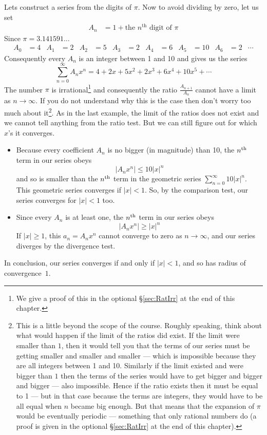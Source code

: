 \begin{eg}\label{eg:PWRd}
Lets construct a series from the digits of $\pi$. Now to avoid dividing by zero, let us set
\begin{align*}
  A_n &= 1 + \text{the $n^\mathrm{th}$ digit of $\pi$}
\end{align*}
Since $\pi = 3.141591\dots$
\begin{align*}
  A_0 &= 4 &
  A_1 &= 2 &
  A_2 &= 5 &
  A_3 &= 2 &
  A_4 &= 6 &
  A_5 &= 10 &
  A_6 &= 2 &
  \cdots
\end{align*}
Consequently every $A_n$ is an integer between 1 and 10 and gives us
the series
\begin{equation*}
\sum_{n=0}^\infty A_n x^n = 4 + 2x + 5x^2 + 2x^3 + 6x^4 +10 x^5 + \cdots
\end{equation*}
The number $\pi$ is irrational\footnote{We give a proof of this in the
optional \S\ref{sec:RatIrr} at the end of this chapter.} and
consequently the ratio $\frac{A_{n+1}}{A_n}$ cannot have a limit as $n\rightarrow\infty$. If you do not understand why
this is the case then don't worry too much about it\footnote{This is a little beyond the scope of the course. Roughly
speaking, think about what would happen if the limit of the
ratios did exist. If the limit were smaller than $1$,
then it would tell you that the terms of our series must be
getting smaller and smaller and smaller --- which is impossible
because they are all integers between 1 and 10. Similarly if the
limit existed and were bigger than $1$ then the terms
of the series would have to get bigger and bigger and bigger ---
also impossible. Hence if the ratio exists then it
must be equal to 1 --- but in that case because the terms are integers, they would have to be all equal when $n$
became big enough. But that means that the expansion of $\pi$
would be eventually periodic ---
something that only rational numbers do (a proof is given in the
optional \S\ref{sec:RatIrr} at the end of this chapter).}.
As in the last example, the limit of the ratios does not exist and
we cannot tell anything from the ratio test. But we can still figure
out for which $x$'s it converges.
\begin{itemize}
\item Because every coefficient $A_n$ is no bigger (in magnitude) than
10, the $n^{\rm th}$ term in our series obeys
\begin{equation*}
\big|A_nx^n\big|\le 10 |x|^n
\end{equation*}
and so is smaller than the $n^{\rm th}$ term in the geometric series
$\sum_{n=0}^\infty 10|x|^n$.
This geometric series converges if $|x|<1$. So, by the comparison test,
our series converges for $|x|<1$ too.
\item Since every $A_n$ is at least one, the $n^{\rm th}$ term in our
series obeys
\begin{equation*}
\big|A_nx^n\big|\ge |x|^n
\end{equation*}
If $|x|\ge 1$, this $a_n=A_n x^n$ cannot converge to zero as
$n\rightarrow\infty$, and our series diverges by the divergence test.
\end{itemize}
In conclusion, our series converges if and only if $|x|<1$, and
so has radius of convergence~$1$.
\end{eg}


